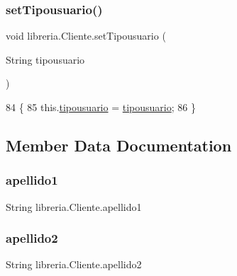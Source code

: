 \subsubsection{\texorpdfstring{set\+Tipousuario()}{setTipousuario()}}
{\footnotesize\ttfamily void libreria.\+Cliente.\+set\+Tipousuario (\begin{DoxyParamCaption}\item[{String}]{tipousuario }\end{DoxyParamCaption})\hspace{0.3cm}{\ttfamily [inline]}}


\begin{DoxyCode}
84                                                    \{
85         this.\mbox{\hyperlink{classlibreria_1_1_cliente_a7b289ea086987adbd145bf6dc8024e9e}{tipousuario}} = \mbox{\hyperlink{classlibreria_1_1_cliente_a7b289ea086987adbd145bf6dc8024e9e}{tipousuario}};
86     \}
\end{DoxyCode}


\subsection{Member Data Documentation}
\mbox{\label{classlibreria_1_1_cliente_a9f1a869f9f8b0e14df73be50e636532e}} 
\subsubsection{\texorpdfstring{apellido1}{apellido1}}
{\footnotesize\ttfamily String libreria.\+Cliente.\+apellido1\hspace{0.3cm}{\ttfamily [private]}}

\mbox{\label{classlibreria_1_1_cliente_a9b97686667a729a4c0fd8b19d72b389a}} 
\subsubsection{\texorpdfstring{apellido2}{apellido2}}
{\footnotesize\ttfamily String libreria.\+Cliente.\+apellido2\hspace{0.3cm}{\ttfamily [private]}}

